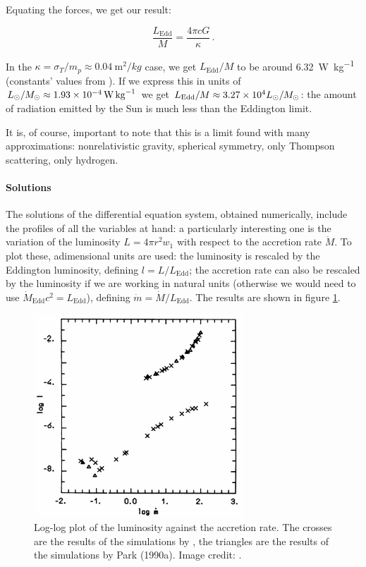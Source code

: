 \documentclass[main.tex]{subfiles}
\begin{document}
Equating the forces, we get our result:

\begin{equation}
 \frac{L_{\text{Edd}}}{M} = \frac{4 \pi c G}{\kappa}\,.
\end{equation}

In the \(\kappa = \sigma_T / m_p \approx \SI{0.04}{\metre^2 / kg}\) case, we get \(L_{\text{Edd}} / M\) to be around \SI{6.32}{\watt\per\kilo\gram} (constants' values from \cite[]{NISTReccomendedConstants:2018}).
If we express this in units of \(L_{\odot} / M_{\odot} \approx \SI{1.93E-04}{\watt\per\kilo\gram}\) \cite[]{SunFactSheet:2018} we get \(L_{\text{Edd}} / M \approx  \num{3.27E+04} L_{\odot} / M_{\odot}\):
the amount of radiation emitted by the Sun is much less than the Eddington limit.

It is, of course, important to note that this is a limit found with many approximations: nonrelativistic gravity, spherical symmetry, only Thompson scattering,
only hydrogen.

\paragraph{Solutions}

The solutions of the differential equation system, obtained numerically, include the profiles of all the variables at hand: a particularly interesting one is the variation of the luminosity \(L = 4 \pi r^2 w_1\) with respect to the accretion rate \(\dot{M}\).
To plot these, adimensional units are used: the luminosity is rescaled by the Eddington luminosity, defining \(l = L / L_{\text{Edd}}\); the accretion rate can also be rescaled by the luminosity if we are working in natural units (otherwise we would need to use \(\dot{M}_{\text{Edd}} c^2 = L_{\text{Edd}}\)), defining \(\dot{m} = \dot{M} / L_{\text{Edd}}\). The results are shown in figure \ref{fig:logl-logm}.

\begin{figure}[ht]
    \centering
    \includegraphics[width=0.7\textwidth]{figures/logl-logm.pdf}
    \caption{Log-log plot of the luminosity against the accretion rate. The crosses are the results of the simulations by \textcite[]{NobiliTurollaZampieri:1991dec}, the triangles are the results of the simulations by Park (1990a). Image credit: \cite[fig. 1]{NobiliTurollaZampieri:1991dec}.}
    \label{fig:logl-logm}
\end{figure}
\end{document}
